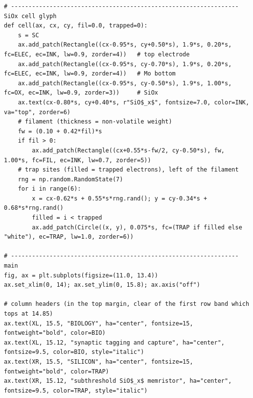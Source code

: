 \begin{lstlisting}[caption={schematics.ipynb code cell 5},label={lst:mrl-nb-schematics-5}]
# ----------------------------------------------------------------- SiOx cell glyph
def cell(ax, cx, cy, fil=0.0, trapped=0):
    s = SC
    ax.add_patch(Rectangle((cx-0.95*s, cy+0.50*s), 1.9*s, 0.20*s, fc=ELEC, ec=INK, lw=0.9, zorder=4))   # top electrode
    ax.add_patch(Rectangle((cx-0.95*s, cy-0.70*s), 1.9*s, 0.20*s, fc=ELEC, ec=INK, lw=0.9, zorder=4))   # Mo bottom
    ax.add_patch(Rectangle((cx-0.95*s, cy-0.50*s), 1.9*s, 1.00*s, fc=OX, ec=INK, lw=0.9, zorder=3))     # SiOx
    ax.text(cx-0.80*s, cy+0.40*s, r"SiO$_x$", fontsize=7.0, color=INK, va="top", zorder=6)
    # filament (thickness = non-volatile weight)
    fw = (0.10 + 0.42*fil)*s
    if fil > 0:
        ax.add_patch(Rectangle((cx+0.55*s-fw/2, cy-0.50*s), fw, 1.00*s, fc=FIL, ec=INK, lw=0.7, zorder=5))
    # trap sites (filled = trapped electrons), left of the filament
    rng = np.random.RandomState(7)
    for i in range(6):
        x = cx-0.62*s + 0.55*s*rng.rand(); y = cy-0.34*s + 0.68*s*rng.rand()
        filled = i < trapped
        ax.add_patch(Circle((x, y), 0.075*s, fc=(TRAP if filled else "white"), ec=TRAP, lw=1.0, zorder=6))

# ----------------------------------------------------------------- main
fig, ax = plt.subplots(figsize=(11.0, 13.4))
ax.set_xlim(0, 14); ax.set_ylim(0, 15.8); ax.axis("off")

# column headers (in the top margin, clear of the first row band which tops at 14.85)
ax.text(XL, 15.5, "BIOLOGY", ha="center", fontsize=15, fontweight="bold", color=BIO)
ax.text(XL, 15.12, "synaptic tagging and capture", ha="center", fontsize=9.5, color=BIO, style="italic")
ax.text(XR, 15.5, "SILICON", ha="center", fontsize=15, fontweight="bold", color=TRAP)
ax.text(XR, 15.12, "subthreshold SiO$_x$ memristor", ha="center", fontsize=9.5, color=TRAP, style="italic")


\end{lstlisting}
